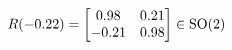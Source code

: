 \documentclass[preview]{standalone}
\begin{document}
\begin{align*}
\special{dvisvgm:raw <g id='unique000'>}R(-0.22) = \begin{bmatrix} 0.98 & 0.21 \\ -0.21 & 0.98 \end{bmatrix} \in \text{SO}(2)\special{dvisvgm:raw </g>}
\end{align*}
\end{document}

